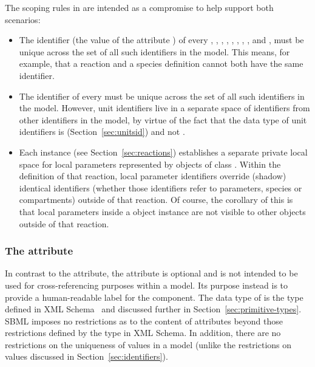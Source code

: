 The scoping rules in \sbmlthree are intended as a compromise to help
support both scenarios:
\begin{itemize}
  
\item The identifier (\ie the value of the attribute ) of
  every \FunctionDefinition, 
  \Compartment, \Species, \Parameter, \Reaction,
  \SpeciesReference, \ModifierSpeciesReference, \Event, and
  \Model, must be unique across the set of all such identifiers in
  the model.  This means, for example, that a reaction and a
  species definition cannot both have the same identifier.

\item The identifier of every \UnitDefinition must be unique
  across the set of all such identifiers in the model.  However,
  unit identifiers live in a separate space of identifiers from
  other identifiers in the model, by virtue of the fact that the
  data type of unit identifiers is 
  (Section~\ref{sec:unitsid}) and not .
  
\item Each \Reaction instance (see Section~\ref{sec:reactions})
  establishes a separate private local space for local parameters
  represented by objects of class \LocalParameter.  Within the
  definition of that reaction, local parameter identifiers
  override (shadow) identical identifiers (whether those
  identifiers refer to parameters, species or compartments)
  outside of that reaction.  Of course, the corollary of this is
  that local parameters inside a \Reaction object instance are not
  visible to other objects outside of that reaction.

\end{itemize}


\subsubsection{The  attribute}
\label{sec:name}

In contrast to the  attribute, the  attribute is
optional and is not intended to be used for cross-referencing
purposes within a model.  Its purpose instead is to provide a
human-readable label for the component.  The data type of 
 is the type  defined in XML
Schema~\citep{biron:2000,thompson:2000} and discussed further in
Section~\ref{sec:primitive-types}.  SBML imposes no restrictions
as to the content of  attributes beyond those restrictions
defined by the  type in XML Schema.
In addition, there are no restrictions on the uniqueness
of  values in a model (unlike the restrictions on
 values discussed in Section~\ref{sec:identifiers}).


